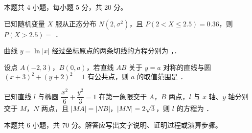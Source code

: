 \begin{gktip}
本题共 4 小题，每小题 5 分，共 20 分。
\end{gktip}

\begin{question}
已知随机变量 $X$ 服从正态分布 $N\left(2,\sigma^{2}\right)$，且 $P(2<X\le2.5)=0.36$，则 $P(X>2.5)=$ \gkblank{}．

\end{question}
\begin{question}
曲线 $y=\ln|x|$ 经过坐标原点的两条切线的方程分别为 \gkblank{}，\gkblank{}．

\end{question}
\begin{question}
设点 $A(-2,3)$，$B(0,a)$，若直线 $AB$ 关于 $y=a$ 对称的直线与圆 $(x+3)^{2}+(y+2)^{2}=1$ 有公共点，则 $a$ 的取值范围是 \gkblank{}．

\end{question}
\begin{question}
已知直线 $l$ 与椭圆 $\dfrac{x^{2}}6+\dfrac{y^{2}}3=1$ 在第一象限交于 $A$，$B$ 两点，$l$ 与 $x$ 轴、$y$ 轴分别交于 $M$，$N$ 两点，且 $|MA|=|NB|$，$|MN|=2\sqrt3$，则 $l$ 的方程为 \gkblank{}．

\par\medskip

\end{question}

\begin{gktip}
本题共 6 小题，共 70 分。解答应写出文字说明、证明过程或演算步骤。
\end{gktip}

